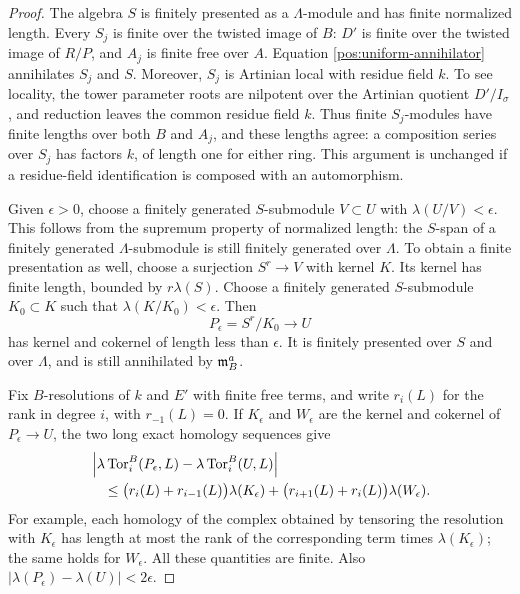 \begin{proof}
The algebra $S$ is finitely presented as a $\Lambda$-module and
has finite normalized length.  Every $S_j$ is finite over the
twisted image of $B$: $D'$ is finite over the twisted image of
$R/P$, and $A_j$ is finite free over $A$.  Equation
\eqref{pos:uniform-annihilator} annihilates $S_j$ and $S$.
Moreover, $S_j$ is Artinian local with residue field $k$.  To see
locality, the tower parameter roots are nilpotent over the
Artinian quotient $D'/I_\sigma$, and reduction leaves the common
residue field $k$.  Thus finite $S_j$-modules have finite lengths
over both $B$ and $A_j$, and these lengths agree: a composition
series over $S_j$ has factors $k$, of length one for either ring.
This argument is unchanged if a residue-field identification is
composed with an automorphism.

Given $\epsilon>0$, choose a finitely generated $S$-submodule
$V\subset U$ with
$\lambda(U/V)<\epsilon$.  This follows from the supremum property
of normalized length: the $S$-span of a finitely generated
$\Lambda$-submodule is still finitely generated over $\Lambda$.
To obtain a finite presentation as well, choose a surjection $S^r\to V$
with kernel $K$.  Its kernel has finite length, bounded by
$r\lambda(S)$.  Choose a finitely generated $S$-submodule $K_0\subset K$ such
that $\lambda(K/K_0)<\epsilon$.  Then
\[
 P_\epsilon=S^r/K_0\longrightarrow U
\]
has kernel and cokernel of length less than $\epsilon$.
It is finitely presented over $S$ and over $\Lambda$, and is
still annihilated by $\mathfrak{m}_B^a$.

Fix $B$-resolutions of $k$ and $E'$ with finite free terms, and write
$r_i(L)$ for the rank in degree $i$, with $r_{-1}(L)=0$.
If $K_\epsilon$ and $W_\epsilon$ are the kernel and cokernel of
$P_\epsilon\to U$, the two long exact homology sequences give
\begin{align}
 &\left|\lambda\operatorname{Tor}_i^B(P_\epsilon,L)
                -\lambda\operatorname{Tor}_i^B(U,L)\right| \notag\\
 &\quad\le
   \bigl(r_i(L)+r_{i-1}(L)\bigr)\lambda(K_\epsilon)
   +\bigl(r_{i+1}(L)+r_i(L)\bigr)\lambda(W_\epsilon).
       \label{pos:tor-approximation-error}
\end{align}
For example, each homology of the complex obtained by tensoring
the resolution with $K_\epsilon$ has length at most the rank of
the corresponding term times $\lambda(K_\epsilon)$; the same
holds for $W_\epsilon$.  All these quantities are finite.  Also
$|\lambda(P_\epsilon)-\lambda(U)|<2\epsilon$.


\end{proof}
